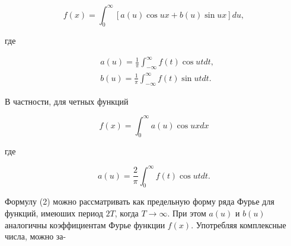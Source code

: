 \documentclass[10pt]{article}
\begin{document}
\[

f(x)=\int_{0}^{\infty}[a(u) \cos u x+b(u) \sin u x] d u,

\]



где



\[

\begin{aligned}

& a(u)=\frac{1}{\pi} \int_{-\infty}^{\infty} f(t) \cos u t d t, \\

& b(u)=\frac{1}{\pi} \int_{-\infty}^{\infty} f(t) \sin u t d t .

\end{aligned}

\]



В частности, для четных функций



\[

f(x)=\int_{0}^{\infty} a(u) \cos u x d x

\]



где



\[

a(u)=\frac{2}{\pi} \int_{0}^{\infty} f(t) \cos u t d t .

\]



Формулу (2) можно рассматривать как предельную форму ряда Фурье для функций, имеюших период $2 T$, когда $T \rightarrow \infty$. При этом $a(u)$ и $b(u)$ аналогичны коэффициентам Фурье функции $f(x)$. Употребляя комплексные числа, можно за-
\end{document}
